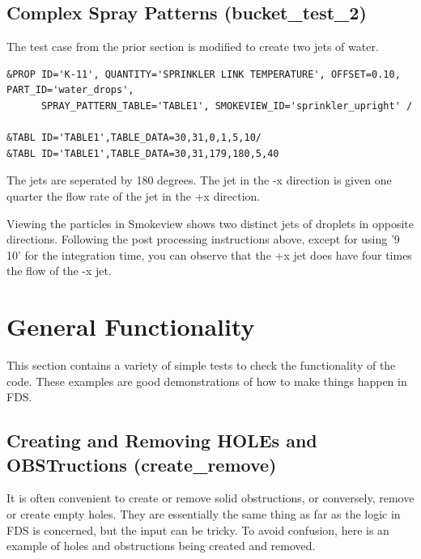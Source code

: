 \documentclass[11pt]{book}
\begin{document}
\normalsize \noindent


\subsection{Complex Spray Patterns ({\bf bucket\_test\_2}) }

The test case from the prior section is modified to create two jets of water.

\footnotesize
\begin{verbatim}
&PROP ID='K-11', QUANTITY='SPRINKLER LINK TEMPERATURE', OFFSET=0.10, PART_ID='water_drops', 
      SPRAY_PATTERN_TABLE='TABLE1', SMOKEVIEW_ID='sprinkler_upright' /

&TABL ID='TABLE1',TABLE_DATA=30,31,0,1,5,10/
&TABL ID='TABLE1',TABLE_DATA=30,31,179,180,5,40
\end{verbatim}
\normalsize

The jets are seperated by 180 degrees.  
The jet in the {\ct -x} direction is given one quarter the flow rate of the jet in the {\ct +x} direction.

Viewing the particles in Smokeview shows two distinct jets of droplets in opposite directions.  
Following the post processing instructions above, except for using '9 10' for the integration time,  you can observe that
the {\ct +x} jet does have four times the flow of the {\ct -x} jet.

\clearpage

\section{General Functionality}

This section contains a variety of simple tests to check the functionality of the code. These examples are good demonstrations of how to
make things happen in FDS.


\subsection{Creating and Removing {\ct HOLE}s and {\ct OBST}ructions ({\bf create\_remove}) }

It is often convenient to create or remove solid obstructions, or conversely, remove or create empty holes. They are essentially the same thing as far as the logic in
FDS is concerned, but the input can be tricky. To avoid confusion, here is an example of holes and obstructions being created and removed.
\end{document}
